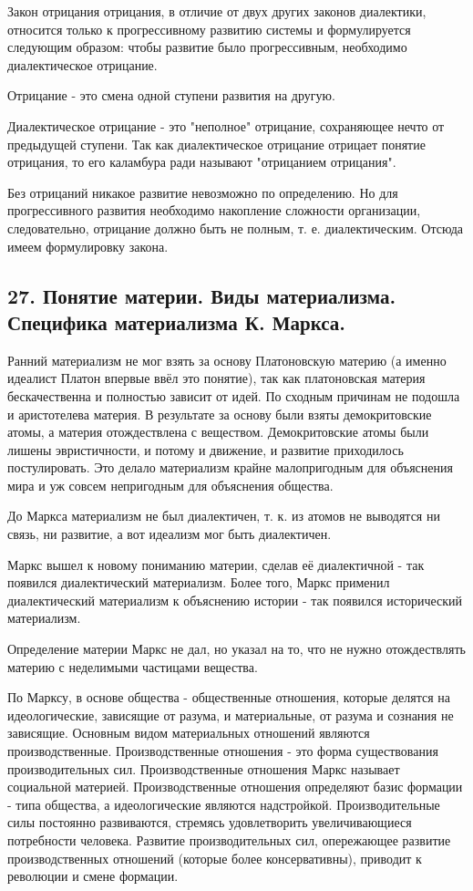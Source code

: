 \documentclass[a4paper, 12pt]{article}
\begin{document}
Закон отрицания отрицания, в отличие от двух других законов диалектики, относится только к прогрессивному развитию системы и формулируется следующим образом: чтобы развитие было прогрессивным, необходимо диалектическое отрицание.

Отрицание - это смена одной ступени развития на другую.

Диалектическое отрицание - это "неполное" отрицание, сохраняющее нечто от предыдущей ступени.
Так как диалектическое отрицание отрицает понятие отрицания, то его каламбура ради называют "отрицанием отрицания".

Без отрицаний никакое развитие невозможно по определению.
Но для прогрессивного развития необходимо накопление сложности организации, следовательно, отрицание должно быть не полным, т. е. диалектическим.
Отсюда имеем формулировку закона.


\subsection*{\textbf{27. Понятие материи. Виды материализма. Специфика материализма К. Маркса.}}

Ранний материализм не мог взять за основу Платоновскую материю (а именно идеалист Платон впервые ввёл это понятие), так как платоновская материя бескачественна и полностью зависит от идей.
По сходным причинам не подошла и аристотелева материя.
В результате за основу были взяты демокритовские атомы, а материя отождествлена с веществом.
Демокритовские атомы были лишены эвристичности, и потому и движение, и развитие приходилось постулировать.
Это делало материализм крайне малопригодным для объяснения мира и уж совсем непригодным для объяснения общества.

До Маркса материализм не был диалектичен, т. к. из атомов не выводятся ни связь, ни развитие, а вот идеализм мог быть диалектичен.

Маркс вышел к новому пониманию материи, сделав её диалектичной - так появился диалектический материализм.
Более того, Маркс применил диалектический материализм к объяснению истории - так появился исторический материализм.

Определение материи Маркс не дал, но указал на то, что не нужно отождествлять материю с неделимыми частицами вещества.

По Марксу, в основе общества - общественные отношения, которые делятся на идеологические, зависящие от разума, и материальные, от разума и сознания не зависящие.
Основным видом материальных отношений являются производственные.
Производственные отношения - это форма существования производительных сил.
Производственные отношения Маркс называет социальной материей.
Производственные отношения определяют базис формации - типа общества, а идеологические являются надстройкой.
Производительные силы постоянно развиваются, стремясь удовлетворить увеличивающиеся потребности человека.
Развитие производительных сил, опережающее развитие производственных отношений (которые более консервативны), приводит к революции и смене формации.
\end{document}
